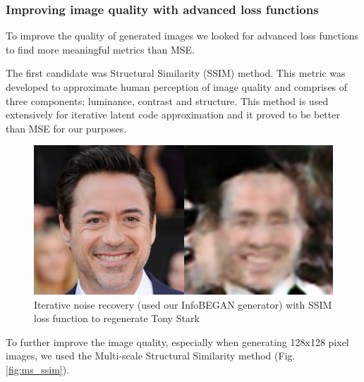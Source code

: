 \documentclass{egpubl}
\begin{document}
\subsubsection{Improving image quality with advanced loss functions}

To improve the quality of generated images we looked for advanced loss functions to find more meaningful metrics than MSE.

The first candidate was Structural Similarity (SSIM) method. This metric was developed to approximate human perception of image quality and comprises of three components: luminance, contrast and structure. This method is used extensively for iterative latent code approximation and it proved to be better than MSE for our purposes.

\begin{figure}[!htb]
	\centering
	\includegraphics[width=1\linewidth]{pic/InfoBEGAN_tony_recovered_ssim}
	\caption{Iterative noise recovery (used our InfoBEGAN generator) with SSIM loss function to regenerate Tony Stark}

\end{figure}

To further improve the image quality, especially when generating 128x128 pixel images, we used the Multi-scale Structural Similarity method (Fig. \ref{fig:ms_ssim}).
\end{document}
